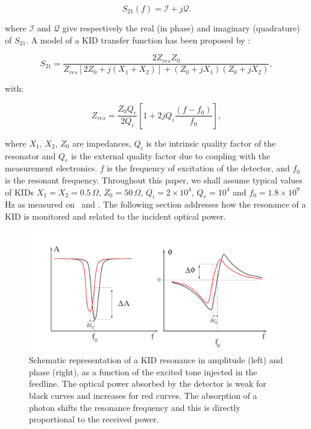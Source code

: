 \begin{equation}
S_{21}(f) = \mathcal{I} +j\mathcal{Q} .
\end{equation}

\noindent where $\mathcal{I}$ and $\mathcal{Q}$ give respectively the real (in phase) and imaginary
(quadrature) of $S_{21}$. A model of a KID transfer function has been proposed
by \citet{2008ApPhL..93m4102G} :

\begin{equation}
S_{21} = \frac{2Z_{res}Z_{0}}{Z_{res}[2Z_{0} + j(X_{1}+X_{2})] + (Z_{0} +jX_{1})(Z_{0} +jX_{2})},
\end{equation}

with:

\begin{equation}
Z_{res} = \frac{Z_{0}Q_{e}}{2Q_{i}}[1 + 2jQ_{i}\frac{(f-f_{0})}{f_{0}}],
\end{equation}

\noindent where $X_{1}$, $X_{2}$, $Z_{0}$ are impedances, $Q_{i}$ is the
intrinsic quality factor of the resonator and $Q_{e}$ is the external quality
factor due to coupling with the measurement electronics. $f$ is the frequency of
excitation of the detector, and $f_{0}$ is the resonant frequency. Throughout
this paper, we shall assume typical values of KIDs $X_{1} = X_{2} =
0.5\,\Omega$, $Z_{0} = 50\,\Omega$, $Q_i=2\times 10^4$, $Q_e=10^4$ and $f_{0} =
1.8\times 10^9$\,Hz as measured on \nika\ and \nikad. The following section
addresses how the resonance of a KID is monitored and related to the incident
optical power.

\begin{figure}
  \includegraphics[clip, angle=0, width=\columnwidth]{Figures/resonance.png}
  \caption{Schematic representation of a KID resonance in amplitude (left) and phase (right), as a function of the excited tone injected in the feedline. The optical power absorbed by the detector is weak for black curves and increases for red curves. The absorption of a photon shifts the resonance frequency and this is directly proportional to the received power.}
  \label{fig:resonance}
\end{figure}



